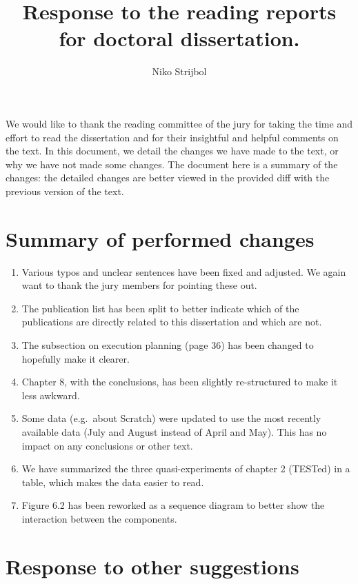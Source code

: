 \documentclass[
    paper=a4,
    paper=portrait,
    parskip=half,
]{scrartcl}
\author{Niko Strijbol}
\title{Response to the reading reports for doctoral dissertation.}
\begin{document}
\maketitle

We would like to thank the reading committee of the jury for taking the time and effort to read the dissertation and for their insightful and helpful comments on the text.
In this document, we detail the changes we have made to the text, or why we have not made some changes.
The document here is a summary of the changes: the detailed changes are better viewed in the provided diff with the previous version of the text.

\section{Summary of performed changes}

\begin{enumerate}
    \item Various typos and unclear sentences have been fixed and adjusted.
        We again want to thank the jury members for pointing these out.
    \item The publication list has been split to better indicate which of the publications are directly related to this dissertation and which are not.
    \item The subsection on execution planning (page 36) has been changed to hopefully make it clearer.
    \item Chapter 8, with the conclusions, has been slightly re-structured to make it less awkward.
    \item Some data (e.g.\ about Scratch) were updated to use the most recently available data (July and August instead of April and May).
        This has no impact on any conclusions or other text.
    \item We have summarized the three quasi-experiments of chapter 2 (TESTed) in a table, which makes the data easier to read.
    \item Figure 6.2 has been reworked as a sequence diagram to better show the interaction between the components.
\end{enumerate}

\section{Response to other suggestions}\label{sec:response-to-other-suggestions}
\end{document}
